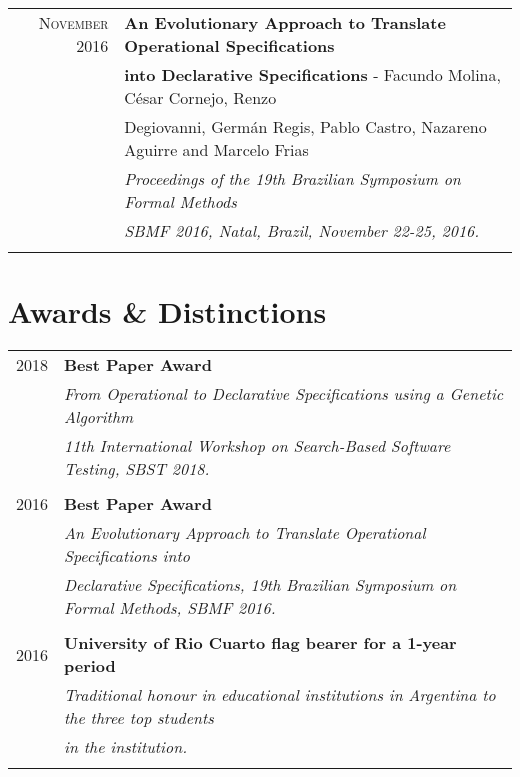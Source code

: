 \documentclass[a4paper,10pt]{article} %
\begin{document}
\begin{longtable}{rl}
\textsc{November} 2016 & \textbf{An Evolutionary Approach to Translate Operational Specifications} \\ & \textbf{into Declarative Specifications} - Facundo Molina, César Cornejo, Renzo \\
& Degiovanni, Germán Regis, Pablo Castro, Nazareno Aguirre and Marcelo Frias \\
& \textit{Proceedings of the 19th Brazilian Symposium on Formal Methods} \\ 
& \textit{SBMF 2016, Natal, Brazil, November 22-25, 2016.} \\ & \\

\end{longtable}

\section{Awards \& Distinctions}
\begin{tabular}{rl}
\\
\textsc{2018} & \textbf{Best Paper Award} \\ 
& \textit{From Operational to Declarative Specifications using a Genetic Algorithm} \\
& \textit{11th International Workshop on Search-Based Software Testing, SBST 2018.} \\ & \\

\textsc{2016} & \textbf{Best Paper Award} \\ 
& \textit{An Evolutionary Approach to Translate Operational Specifications into } \\
& \textit{Declarative Specifications, 19th Brazilian Symposium on Formal Methods, SBMF 2016.} \\ & \\

\textsc{2016} & \textbf{University of Rio Cuarto flag bearer for a 1-year period} \\ 
& \textit{Traditional honour in educational institutions in Argentina to the three top students} \\ 
& \textit{in the institution.} \\ & \\
\end{tabular}
\end{document}
